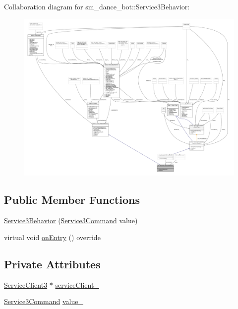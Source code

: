 Collaboration diagram for sm\+\_\+dance\+\_\+bot\+:\+:Service3\+Behavior\+:
\nopagebreak
\begin{figure}[H]
\begin{center}
\leavevmode
\includegraphics[width=350pt]{classsm__dance__bot_1_1Service3Behavior__coll__graph}
\end{center}
\end{figure}
\subsection*{Public Member Functions}
\begin{DoxyCompactItemize}
\item 
\hyperlink{classsm__dance__bot_1_1Service3Behavior_a26ffa9c2dab54432c5781df20fa0275c}{Service3\+Behavior} (\hyperlink{namespacesm__dance__bot_a2d0902aa29698165effd2c3248a9c8ff}{Service3\+Command} value)
\item 
virtual void \hyperlink{classsm__dance__bot_1_1Service3Behavior_a865256f9d383977aa2a8666678f402bc}{on\+Entry} () override
\end{DoxyCompactItemize}
\subsection*{Private Attributes}
\begin{DoxyCompactItemize}
\item 
\hyperlink{classsm__dance__bot_1_1ServiceClient3}{Service\+Client3} $\ast$ \hyperlink{classsm__dance__bot_1_1Service3Behavior_afe77243f8c5938cf9c754897d41cceff}{service\+Client\+\_\+}
\item 
\hyperlink{namespacesm__dance__bot_a2d0902aa29698165effd2c3248a9c8ff}{Service3\+Command} \hyperlink{classsm__dance__bot_1_1Service3Behavior_a85d2c6056f1cc77bcfc0139c4ce71ba9}{value\+\_\+}
\end{DoxyCompactItemize}
